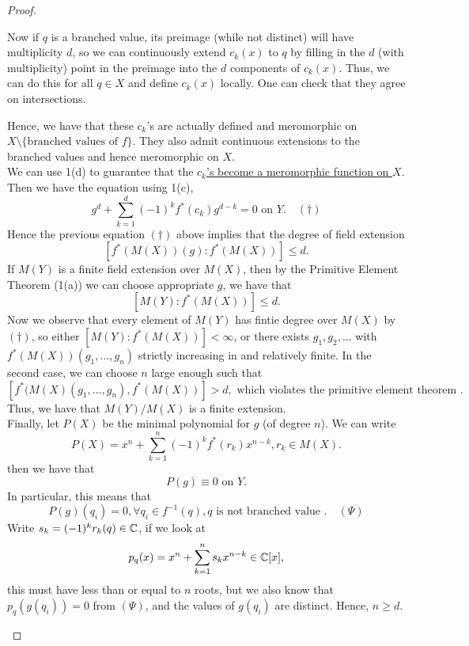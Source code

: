 \documentclass{article}
\begin{document}
{\begin{proof}
\begin{enumerate}
        Now if $q$ is a branched value, its preimage (while not distinct) will have multiplicity $d$, so we can continuously extend $c_k(x)$ to $q$ by filling in the $d$ (with multiplicity) point in the preimage into the $d$ components of $c_k(x)$. Thus, we can do this for all $q \in X$ and define $c_k(x)$ locally. One can check that they agree on intersections.
        
        
        Hence, we have that these $c_k$'s are actually defined and meromorphic on $X \setminus \{\text{branched values of $f$}\}$. They also admit continuous extensions to the branched values and hence meromorphic on $X$.\\

        We can use 1(d) to guarantee that the \underline{$c_k$'s become a meromorphic function on $X$}. Then we have the equation using 1(c),
        \[g^d + \sum_{k = 1}^d (-1)^k f^*(c_k) g^{d-k} = 0 \text{ on $Y$}. \quad (\dagger)\]
        Hence the previous equation $(\dagger)$ above implies that the degree of field extension
        \[[f^*(M(X))(g): f^*(M(X))] \leq d.\]
        If $M(Y)$ is a finite field extension over $M(X)$, then by the Primitive Element Theorem (1(a)) we can choose appropriate $g$, we have that
        \[[M(Y): f^*(M(X))] \leq d.\]
        Now we observe that every element of $M(Y)$ has fintie degree over $M(X)$ by $(\dagger)$, so either $[M(Y): f^*(M(X))] < \infty$, or there exists $g_1, g_2, ...$ with $f^*(M(X))(g_1, ..., g_n)$ strictly increasing in and relatively finite. In the second case, we can choose $n$ large enough such that
        \[[f^*(M(X)(g_1, ..., g_n), f^*(M(X))] > d, \text{ which violates the primitive element theorem }.\]
        Thus, we have that $M(Y)/M(X)$ is a finite extension.\\

        Finally, let $P(X)$ be the minimal polynomial for $g$ (of degree $n$). We can write
        \[P(X) = x^n + \sum_{k=1}^n (-1)^k f^*(r_k) x^{n-k}, r_k \in M(X). \]
        then we have that 
        \[P(g) \equiv 0 \text{ on $Y$}.\]
        In particular, this means that 
        \[P(g)(q_i) = 0, \forall q_i \in f^{-1}(q), q \text{ is not branched value }. \quad (\Psi)\]
        Write $s_k = (-1)^k r_k(q) \in \mathbb{C}$, if we look at
        \[p_q(x) = x^n + \sum_{k=1}^{n} s_k x^{n-k} \in \mathbb{C}[x],\]
        this must have less than or equal to $n$ roots, but we also know that $p_q(g(q_i)) = 0$ from $(\Psi)$, and the values of $g(q_i)$ are distinct. Hence, $n \geq d$.\\


\end{enumerate}
\end{proof}}
\end{document}
